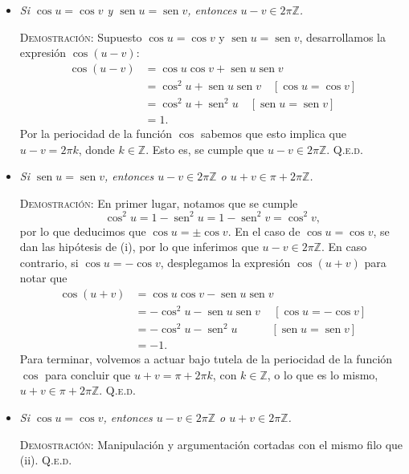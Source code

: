 \documentclass{article}
\renewcommand{\sin}{\operatorname{sen}}
\begin{document}
\begin{itemize}
        \item[\textit{(i)}] \textit{Si $\cos u = \cos v$ y $\sin u = \sin v$, entonces $u - v \in 2\pi\mathbb{Z}$.}

        \textsc{Demostración}: Supuesto $\cos u = \cos v$ y $\sin u = \sin v$, desarrollamos la expresión $\cos(u - v)$:
        \begin{equation*}
            \begin{split}
                \cos(u-v) &= \cos u \cos v + \sin u \sin v \\
                &= \cos^2u + \sin u \sin v \quad [\cos u = \cos v] \\
                &= \cos^2u + \sin^2u \quad [\sin u = \sin v] \\
                &= 1.
            \end{split}
        \end{equation*}
        Por la periocidad de la función $\cos$ sabemos que esto implica que $u - v = 2\pi k$, donde $k \in \mathbb{Z}$. Esto es, se cumple que $u - v \in 2\pi\mathbb{Z}$. \hfill{\textsc{Q.e.d.}}

        \medskip
    
        \item[\textit{(ii)}] \textit{Si $\sin u = \sin v$, entonces $u - v \in 2\pi\mathbb{Z}$ o $u + v \in \pi + 2\pi\mathbb{Z}$.}

            \textsc{Demostración}: En primer lugar, notamos que se cumple \[\cos^2u = 1 - \sin^2u = 1 - \sin^2v = \cos^2v,\] por lo que deducimos que $\cos u = \pm \cos v$. En el caso de $\cos u = \cos v$, se dan las hipótesis de (i), por lo que inferimos que $u - v \in 2\pi\mathbb{Z}$. En caso contrario, si $\cos u = -\cos v$, desplegamos la expresión $\cos(u+v)$ para notar que
        \begin{equation*}
            \begin{split}
                \cos(u+v) &= \cos u \cos v - \sin u \sin v \\
                &= -\cos^2u - \sin u \sin v \quad \, [\cos u = -\cos v] \\
                &= -\cos^2u - \sin^2u \qquad \quad [\sin u = \sin v] \\
                &= -1.
            \end{split}
        \end{equation*}
        Para terminar, volvemos a actuar bajo tutela de la periocidad de la función $\cos$ para concluir que $u + v = \pi + 2\pi k$, con $k \in \mathbb{Z}$, o lo que es lo mismo, $u + v \in \pi + 2\pi\mathbb{Z}$. \hfill{\textsc{Q.e.d.}} 

        \medskip

        \item[\textit{(iii)}] \textit{Si $\cos u = \cos v$, entonces $u - v \in 2\pi\mathbb{Z}$ o $u + v \in 2\pi\mathbb{Z}$.}

        \textsc{Demostración}: Manipulación y argumentación cortadas con el mismo filo que (ii). \hfill{\textsc{Q.e.d.}}
\end{itemize}
\end{document}
